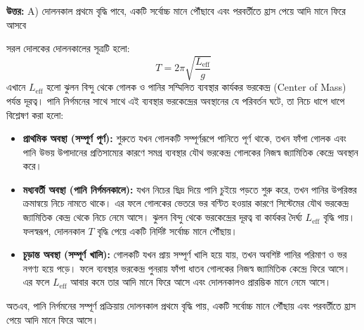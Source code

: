 \documentclass[12pt, a4paper]{article}
\begin{document}
\vspace{0.5em}
\begin{tcolorbox}[answerbox]
\textbf{\color{success} উত্তর:} A) দোলনকাল প্রথমে বৃদ্ধি পাবে, একটি সর্বোচ্চ মানে পৌঁছাবে এবং পরবর্তীতে হ্রাস পেয়ে আদি মানে ফিরে আসবে
\end{tcolorbox}
\vspace{1em}

\begin{tcolorbox}[solutionbox={সমাধান (Solution)}]
\noindent
সরল দোলকের দোলনকালের সূত্রটি হলো:
\[ T = 2\pi \sqrt{\frac{L_{\text{eff}}}{g}} \]
এখানে $L_{\text{eff}}$ হলো ঝুলন বিন্দু থেকে গোলক ও পানির সম্মিলিত ব্যবস্থার কার্যকর ভরকেন্দ্র (Center of Mass) পর্যন্ত দূরত্ব। পানি নির্গমনের সাথে সাথে এই ব্যবস্থার ভরকেন্দ্রের অবস্থানের যে পরিবর্তন ঘটে, তা নিচে ধাপে ধাপে বিশ্লেষণ করা হলো:
\begin{itemize}[label={--}, leftmargin=1cm, itemsep=0.4em]
    \item \textbf{প্রাথমিক অবস্থা (সম্পূর্ণ পূর্ণ):} শুরুতে যখন গোলকটি সম্পূর্ণরূপে পানিতে পূর্ণ থাকে, তখন ফাঁপা গোলক এবং পানি উভয় উপাদানের প্রতিসাম্যের কারণে সমগ্র ব্যবস্থার যৌথ ভরকেন্দ্র গোলকের নিজস্ব জ্যামিতিক কেন্দ্রে অবস্থান করে।
    \item \textbf{মধ্যবর্তী অবস্থা (পানি নির্গমনকালে):} যখন নিচের ছিদ্র দিয়ে পানি চুইয়ে পড়তে শুরু করে, তখন পানির উপরিস্তর ক্রমান্বয়ে নিচে নামতে থাকে। এর ফলে গোলকের ভেতরে ভর বণ্টিত হওয়ার কারণে সিস্টেমের যৌথ ভরকেন্দ্র জ্যামিতিক কেন্দ্র থেকে নিচে নেমে আসে। ঝুলন বিন্দু থেকে ভরকেন্দ্রের দূরত্ব বা কার্যকর দৈর্ঘ্য $L_{\text{eff}}$ বৃদ্ধি পায়। ফলস্বরূপ, দোলনকাল $T$ বৃদ্ধি পেয়ে একটি নির্দিষ্ট সর্বোচ্চ মানে পৌঁছায়।
    \item \textbf{চূড়ান্ত অবস্থা (সম্পূর্ণ খালি):} গোলকটি যখন প্রায় সম্পূর্ণ খালি হয়ে যায়, তখন অবশিষ্ট পানির পরিমাণ ও ভর নগণ্য হয়ে পড়ে। ফলে ব্যবস্থার ভরকেন্দ্র পুনরায় ফাঁপা ধাতব গোলকের নিজস্ব জ্যামিতিক কেন্দ্রে ফিরে আসে। এর ফলে $L_{\text{eff}}$ আবার কমে তার আদি মানে ফিরে আসে এবং দোলনকালও প্রারম্ভিক মানে নেমে আসে।
\end{itemize}
অতএব, পানি নির্গমনের সম্পূর্ণ প্রক্রিয়ায় দোলনকাল প্রথমে বৃদ্ধি পায়, একটি সর্বোচ্চ মানে পৌঁছায় এবং পরবর্তীতে হ্রাস পেয়ে আদি মানে ফিরে আসে।
\end{tcolorbox}

\newpage
\end{document}

